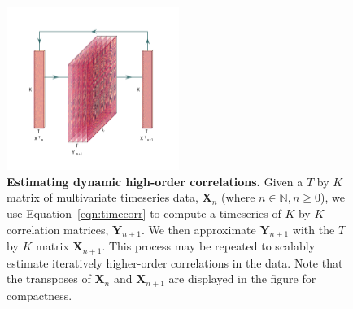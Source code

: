 \documentclass[english]{article}
\begin{document}
\begin{figure}
  \centering
  \includegraphics[width=0.5\textwidth]{figs/methods_fig}
  \caption{\textbf{Estimating dynamic high-order correlations.}  Given
    a $T$ by $K$ matrix of multivariate timeseries data,
    $\mathbf{X}_n$ (where $n \in \mathbb{N}, n \geq 0$), we use
    Equation~\ref{eqn:timecorr} to compute a timeseries of
    $K$ by $K$ correlation matrices, $\mathbf{Y}_{n+1}$.  We then
    approximate $\mathbf{Y}_{n+1}$ with the $T$ by $K$ matrix
    $\mathbf{X}_{n+1}$.  This process may be repeated to scalably estimate
    iteratively higher-order correlations in the data.  Note that the
    transposes of $\mathbf{X}_n$ and $\mathbf{X}_{n+1}$ are displayed
    in the figure for compactness.
  \label{fig:methods}}
\end{figure}
\end{document}

